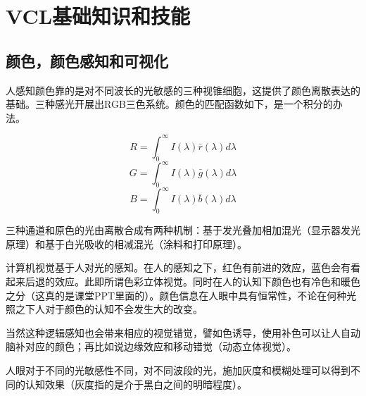\section{VCL基础知识和技能}

\subsection{颜色，颜色感知和可视化}

人感知颜色靠的是对不同波长的光敏感的三种视锥细胞，这提供了颜色离散表达的基础。三种感光开展出RGB三色系统。颜色的匹配函数如下，是一个积分的办法。

\[
R=\int_0^{\infty}I(\lambda)\bar{r}(\lambda)d\lambda
\]
\[
G=\int_0^{\infty}I(\lambda)\bar{g}(\lambda)d\lambda
\]
\[
B=\int_0^{\infty}I(\lambda)\bar{b}(\lambda)d\lambda
\]

三种通道和原色的光由离散合成有两种机制：基于发光叠加相加混光（显示器发光原理）和基于白光吸收的相减混光（涂料和打印原理）。

计算机视觉基于人对光的感知。在人的感知之下，红色有前进的效应，蓝色会有看起来后退的效应。此即所谓色彩立体视觉。同时在人的认知下颜色也有冷色和暖色之分（这真的是课堂PPT里面的）。颜色信息在人眼中具有恒常性，不论在何种光照之下人对于颜色的认知不会发生大的改变。

当然这种逻辑感知也会带来相应的视觉错觉，譬如色诱导，使用补色可以让人自动脑补对应的颜色；再比如说边缘效应和移动错觉（动态立体视觉）。

人眼对于不同的光敏感性不同，对不同波段的光，施加灰度和模糊处理可以得到不同的认知效果（灰度指的是介于黑白之间的明暗程度）。

